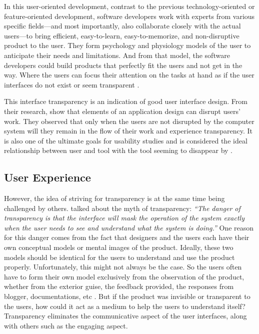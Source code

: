 \documentclass[a4paper,titlepage]{article}
\begin{document}
In this user-oriented development, contrast to the previous
technology-oriented or feature-oriented development, software
developers work with experts from various specific fields---and most
importantly, also collaborate closely with the actual users---to bring
efficient, easy-to-learn, easy-to-memorize, and non-disruptive product
to the user. They form psychology and physiology models of the user to
anticipate their needs and limitations. And from that model, the
software developers could build products that perfectly fit the users
and not get in the way. Where the users can focus their attention on
the tasks at hand as if the user interfaces do not exist or seem
transparent \citep{computer:weiser}.

This interface transparency is an indication of good user interface
design. From their research, \citet{transparency:holtzblatt} show that
elements of an application design can disrupt users' work. They
observed that only when the users are not disrupted by the computer
system will they remain in the flow of their work and experience
transparency. It is also one of the ultimate goals for usability
studies and is considered the ideal relationship between user and tool
with the tool seeming to disappear by \citet{transparency:rutkoski}.

\subsection{User Experience}
However, the idea of striving for transparency is at the same time
being challenged by others. \citet[p.~55]{windows:bolter} talked about
the myth of transparency: {\it ``The danger of transparency is that
  the interface will mask the operation of the system exactly when the
  user needs to see and understand what the system is doing.''} One
reason for this danger comes from the fact that designers and the
users each have their own conceptual models or mental images of the
product. Ideally, these two models should be identical for the users
to understand and use the product properly. Unfortunately, this might
not always be the case. So the users often have to form their own
model exclusively from the observation of the product, whether from
the exterior guise, the feedback provided, the responses from blogger,
documentations, etc \citet{design:norman}. But if the product was
invisible or transparent to the users, how could it act as a medium to
help the users to understand itself? Transparency eliminates the
communicative aspect of the user interfaces, along with others such as
the engaging aspect.
\end{document}
